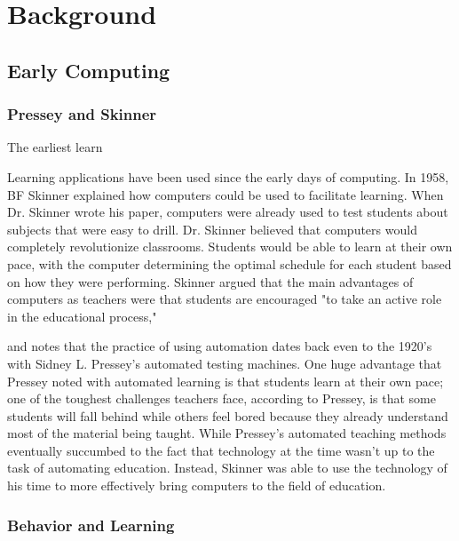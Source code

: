 \chapter{Background}
\section{Early Computing}

\subsection{Pressey and Skinner}
\par The earliest learn

\par Learning applications have been used since the early days of computing. In 1958, BF Skinner \cite{skinner1958teaching} explained how computers could be used to facilitate learning. When Dr. Skinner wrote his paper, computers were already used to test students about subjects that were easy to drill. Dr. Skinner believed that computers would completely revolutionize classrooms. Students would be able to learn at their own pace, with the computer determining the optimal schedule for each student based on how they were performing. Skinner argued that the main advantages of computers as teachers were that students are encouraged "to take an active role in the educational process," 


and notes that the practice of using automation dates back even to the 1920's with Sidney L. Pressey's automated testing machines. One huge advantage that Pressey noted with automated learning is that students learn at their own pace; one of the toughest challenges teachers face, according to Pressey, is that some students will fall behind while others feel bored because they already understand most of the material being taught. While Pressey's automated teaching methods eventually succumbed to the fact that technology at the time wasn't up to the task of automating education. Instead, Skinner was able to use the technology of his time to more effectively bring computers to the field of education.

\subsection{Behavior and Learning}

